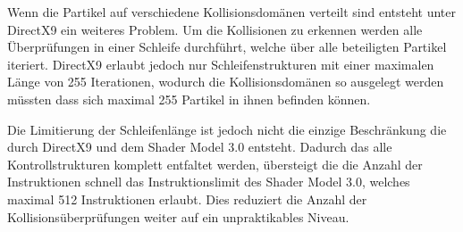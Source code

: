 \begin{Spacing}{\mylinespace}
		Wenn die Partikel auf verschiedene Kollisionsdomänen verteilt sind entsteht
		unter DirectX9 ein weiteres Problem. Um die Kollisionen zu erkennen
		werden alle Überprüfungen in einer Schleife durchführt, welche über alle
		beteiligten Partikel iteriert. DirectX9 erlaubt jedoch nur Schleifenstrukturen
		mit einer maximalen Länge von 255 Iterationen, wodurch die
		Kollisionsdomänen so ausgelegt werden müssten dass sich maximal
		255 Partikel in ihnen befinden können.
		
		Die Limitierung der Schleifenlänge ist jedoch nicht die einzige
		Beschränkung die durch DirectX9 und dem Shader Model 3.0 entsteht.
		Dadurch das alle Kontrollstrukturen komplett entfaltet werden, übersteigt die
		die Anzahl der Instruktionen schnell das Instruktionslimit des
		Shader Model 3.0, welches maximal 512 Instruktionen erlaubt.
		Dies reduziert die Anzahl der Kollisionsüberprüfungen
		weiter auf ein unpraktikables Niveau. 
		
		

\end{Spacing}
